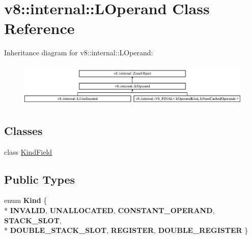 \hypertarget{classv8_1_1internal_1_1_l_operand}{}\section{v8\+:\+:internal\+:\+:L\+Operand Class Reference}
\label{classv8_1_1internal_1_1_l_operand}
Inheritance diagram for v8\+:\+:internal\+:\+:L\+Operand\+:\begin{figure}[H]
\begin{center}
\leavevmode
\includegraphics[height=2.142857cm]{classv8_1_1internal_1_1_l_operand}
\end{center}
\end{figure}
\subsection*{Classes}
\begin{DoxyCompactItemize}
\item 
class \hyperlink{classv8_1_1internal_1_1_l_operand_1_1_kind_field}{Kind\+Field}
\end{DoxyCompactItemize}
\subsection*{Public Types}
\begin{DoxyCompactItemize}
\item 
\hypertarget{classv8_1_1internal_1_1_l_operand_a0a6ec67e6248454953fad3a633ecf53c}{}enum {\bfseries Kind} \{ \\*
{\bfseries I\+N\+V\+A\+L\+I\+D}, 
{\bfseries U\+N\+A\+L\+L\+O\+C\+A\+T\+E\+D}, 
{\bfseries C\+O\+N\+S\+T\+A\+N\+T\+\_\+\+O\+P\+E\+R\+A\+N\+D}, 
{\bfseries S\+T\+A\+C\+K\+\_\+\+S\+L\+O\+T}, 
\\*
{\bfseries D\+O\+U\+B\+L\+E\+\_\+\+S\+T\+A\+C\+K\+\_\+\+S\+L\+O\+T}, 
{\bfseries R\+E\+G\+I\+S\+T\+E\+R}, 
{\bfseries D\+O\+U\+B\+L\+E\+\_\+\+R\+E\+G\+I\+S\+T\+E\+R}
 \}\label{classv8_1_1internal_1_1_l_operand_a0a6ec67e6248454953fad3a633ecf53c}

\end{DoxyCompactItemize}

